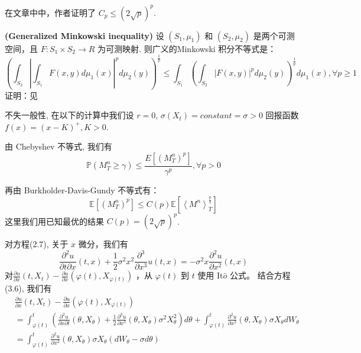 在文章中\cite{LPEstimates}中，作者证明了 $C_p\leq (2\sqrt{p})^p$.

\textbf{(Generalized Minkowski inequality)}
设 $(S_1,\mu_1)$ 和 $(S_2,\mu_2)$ 是两个可测空间，且 $F : S_1\times S_2\rightarrow R$ 为可测映射. 
则广义的Minkowski 积分不等式是：
\begin{equation}
(\int_{S_2}|\int_{S_1}F(x,y)d\mu_1(x)|^pd\mu_2(y))^{\frac{1}{p}}\leq \int_{S_1}(\int_{S_2}|F(x,y)|^pd\mu_2(y))^{\frac{1}{p}}d\mu_1(x), \forall p\geq 1
\end{equation}
证明：见\cite{SingularIntegrals}

不失一般性, 在以下的计算中我们设 $r=0$, $\sigma(X_t)=constant=\sigma>0$ 回报函数 $f(x)=(x-K)^{+}, K>0$.  

由 Chebyshev 不等式, 我们有 
$$\mathbb{P}(M_T^n\geq \gamma)\leq \frac{E[(M_T^n)^p]}{\gamma^p}, \forall p>0$$

再由 Burkholder-Davis-Gundy 不等式有： 
\begin{equation}
\mathbb{E}[(M_T^n)^p]\leq C(p)\mathbb{E}[\left \langle M^n \right \rangle_T^{\frac{p}{2}}]
\end{equation}
这里我们用已知最优的结果 $C(p)=(2\sqrt{p})^p$.

对方程(2.7), 关于 $x$ 微分，我们有
\begin{equation}
\frac{\partial^2 u}{\partial t \partial x}(t, x) +\frac{1}{2}\sigma^2x^2\frac{\partial^3}{\partial x^3}u(t,x)=
-\sigma^2x\frac{\partial^2u}{\partial x^2}(t, x)
\end{equation}
对$\frac{\partial u}{\partial x}(t, X_t)-\frac{\partial u}{\partial x}(\varphi(t), X_{\varphi(t)})$ ，从 $\varphi(t)$ 到 $t$ 使用 It$\hat{o}$ 公式。
结合方程 (3.6), 我们有
\begin{equation}
\begin{split}
&\frac{\partial u}{\partial x}(t, X_t)-\frac{\partial u}{\partial x}(\varphi(t), X_{\varphi(t)})\\
&=\int_{\varphi(t)}^t (\frac{\partial^2 u}{\partial x\partial t}(\theta, 
X_\theta)+\frac{1}{2}\frac{\partial^3 u}{\partial x^3}(\theta, X_\theta)\sigma^2X^2_\theta) d\theta
+ \int_{\varphi(t)}^t \frac{\partial^2 u}{\partial x^2}(\theta, X_\theta)\sigma X_\theta dW_\theta\\
&=  \int_{\varphi(t)}^t \frac{\partial^2 u}{\partial x^2}(\theta, X_\theta)\sigma X_\theta (dW_\theta-\sigma d\theta)\\
\end{split}
\end{equation}

